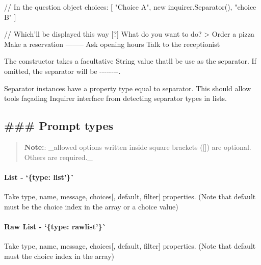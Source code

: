 \begin{DoxyCode}
// In the question object
choices: [ "Choice A", new inquirer.Separator(), "choice B" ]

// Which'll be displayed this way
[?] What do you want to do?
 > Order a pizza
   Make a reservation
   --------
   Ask opening hours
   Talk to the receptionist
\end{DoxyCode}


The constructor takes a facultative {\ttfamily String} value that\textquotesingle{}ll be use as the separator. If omitted, the separator will be {\ttfamily -\/-\/-\/-\/-\/-\/-\/-\/}.

Separator instances have a property {\ttfamily type} equal to {\ttfamily separator}. This should allow tools façading Inquirer interface from detecting separator types in lists.

\label{_prompt}%
 \subsection*{\#\#\# Prompt types }

\begin{quote}
{\bfseries Note\+:}\+: \+\_\+allowed options written inside square brackets ({\ttfamily \mbox{[}\mbox{]}}) are optional. Others are required.\+\_\+ \end{quote}


\paragraph*{List -\/ `\{type\+: \textquotesingle{}list'\}\`{}}

Take {\ttfamily type}, {\ttfamily name}, {\ttfamily message}, {\ttfamily choices}\mbox{[}, {\ttfamily default}, {\ttfamily filter}\mbox{]} properties. (Note that default must be the choice {\ttfamily index} in the array or a choice {\ttfamily value})

 



\paragraph*{Raw List -\/ `\{type\+: \textquotesingle{}rawlist'\}\`{}}

Take {\ttfamily type}, {\ttfamily name}, {\ttfamily message}, {\ttfamily choices}\mbox{[}, {\ttfamily default}, {\ttfamily filter}\mbox{]} properties. (Note that default must the choice {\ttfamily index} in the array)

